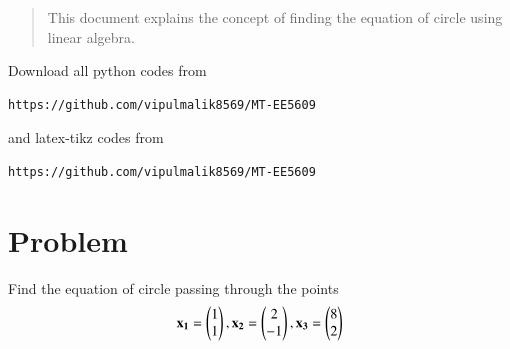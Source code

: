 \documentclass[journal,12pt,twocolumn]{IEEEtran}
\begin{document}
\date{\today}

\maketitle
\newpage
\bigskip
\renewcommand{\thefigure}{\theenumi}
\renewcommand{\thetable}{\theenumi}

\begin{abstract}
This document explains the concept of finding the equation of circle using linear algebra.
\end{abstract}
Download all python codes from 
\begin{lstlisting}
https://github.com/vipulmalik8569/MT-EE5609
\end{lstlisting}
and latex-tikz codes from 
\begin{lstlisting}
https://github.com/vipulmalik8569/MT-EE5609
\end{lstlisting}
\section{\textbf{Problem}}
Find the equation of circle passing through the points
\begin{align}
    \mathbf{x_1}=\begin{pmatrix}1\\1\end{pmatrix}, \mathbf{x_2}=\begin{pmatrix}2\\-1\end{pmatrix}, \mathbf{x_3}=\begin{pmatrix}8\\2\end{pmatrix}\label{eq:0}
\end{align}
\end{document}
